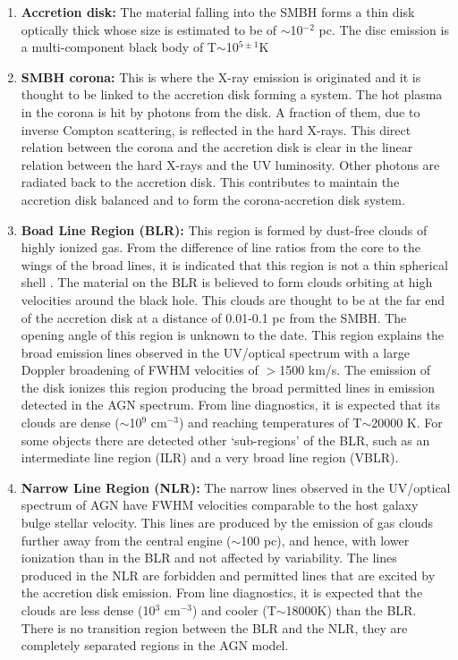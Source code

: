 \begin{enumerate}
\item \textbf{Accretion disk:} The material falling into the SMBH forms a thin disk optically thick whose size is estimated to be of $\sim$10$^{-2}$ pc. The disc emission is a multi-component black body of T$\sim$10$^{5\pm 1}$K

\item \textbf{SMBH corona:} This is where the X-ray emission is originated and it is thought to be linked to the accretion disk forming a system. The hot plasma in the corona is hit by photons from the disk. A fraction of them, due to inverse Compton scattering, is reflected in the hard X-rays. This direct relation between the corona and the accretion disk is clear in the linear relation between the hard X-rays and the UV luminosity. Other photons are radiated back to the accretion disk. This contributes to maintain the accretion disk balanced and to form the corona-accretion disk system.

\item \textbf{Boad Line Region (BLR):} This region is formed by dust-free clouds of highly ionized gas. From the difference of line ratios from the core to the wings of the broad lines, it is indicated that this region is not a thin spherical shell \citep{crenshaw86}. The material on the BLR is believed to form clouds orbiting at high velocities around the black hole. This clouds are thought to be at the far end of the accretion disk at a distance of 0.01-0.1 pc from the SMBH. The opening angle of this region is unknown to the date. This region explains the broad emission lines observed in the UV/optical spectrum with a large Doppler broadening of FWHM velocities of $>$1500 km/s. The emission of the disk ionizes this region producing the broad permitted lines in emission detected in the AGN spectrum. From line diagnostics, it is expected that its clouds are dense ($\sim$10$^9$ cm$^{-3}$) and reaching temperatures of T$\sim$20000 K. For some objects there are detected other ‘sub-regions’ of the BLR, such as an intermediate line region (ILR) and a very broad line region (VBLR).


\item \textbf{Narrow Line Region (NLR):} The narrow lines observed in the UV/optical spectrum of AGN have FWHM velocities comparable to the host galaxy bulge stellar velocity. This lines are produced by the emission of gas clouds further away from the central engine ($\sim$100 pc), and hence, with lower ionization than in the BLR and not affected by variability. The lines produced in the NLR are forbidden and permitted lines that are excited by the accretion disk emission. From line diagnostics, it is expected that the clouds are less dense (10$^{3}$ cm$^{-3}$) and cooler (T$\sim$18000K) than the BLR. There is no transition region between the BLR and the NLR, they are completely separated regions in the AGN model.



\end{enumerate}
